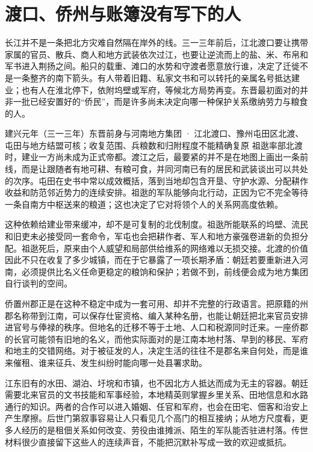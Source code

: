 \section{渡口、侨州与账簿没有写下的人}
\label{sec:eastern-jin-depth-migration-fiscal}

长江并不是一条把北方灾难自然隔在岸外的线。三一三年前后，江北渡口要让携带家属的官员、散兵、商人和地方武装依次过江，也要让逆流而上的盐、米、布帛和军书进入荆扬之间。船只的载重、滩口的水势和守渡者愿意放行谁，决定了迁徙不是一条整齐的南下箭头。有人带着旧籍、私家文书和可以转托的亲属名号抵达建业；也有人在淮北停下，依附坞壁或军府，等候北方局势再变。东晋最初面对的并非一批已经安置好的“侨民”，而是许多尚未决定向哪一种保护关系缴纳劳力与粮食的人。

\begin{event}{}{建兴元年（三一三年）}{东晋前身与河南地方集团 · 江北渡口、豫州屯田区}{北渡、屯田与地方结盟可核；收复范围、兵粮数和归附程度不能精确复原}
祖逖率部北渡时，建业一方尚未成为正式帝都。渡江之后，最要紧的并不是在地图上画出一条前线，而是让跟随者有地可耕、有粮可食，并同河南已有的居民和武装谈出可以共处的次序。屯田在史书中常以成效概括，落到当地却包含开垦、守护水源、分配耕作收益和防范邻近势力的连续安排。祖逖的军队能够向北行动，正因为它不完全等待一条自南方中枢送来的粮道；这也决定了它对将领个人的关系网高度依赖。

这种依赖给建业带来缓冲，却不是可复制的北伐制度。祖逖所能联系的坞壁、流民和旧吏未必接受同一套命令，军屯也会把耕作者、军人和地方豪强卷进新的负担分配。祖逖死后，原来由个人威望和局部供给维系的网络难以无损交接。北渡的价值因此不只在收复了多少城镇，而在于它暴露了一项长期矛盾：朝廷若要重新进入河南，必须提供比名义任命更稳定的粮饷和保护；若做不到，前线便会成为地方集团自行谈判的空间。
\end{event}

侨置州郡正是在这种不稳定中成为一套可用、却并不完整的行政语言。把原籍的州郡名称带到江南，可以保存仕宦资格、编入某种名册，也能让朝廷把北来官员安排进官号与俸禄的秩序。但地名的迁移不等于土地、人口和税源同时迁来。一座侨郡的长官可能领有旧地的名义，而他实际面对的是江南本地村落、早到的移民、军府和地主的交错网络。对于被征发的人，决定生活的往往不是郡名来自何处，而是谁来催租、谁来征兵、发生纠纷时能向哪一处县署求助。

江东旧有的水田、湖泊、圩垸和市镇，也不因北方人抵达而成为无主的容器。朝廷需要北来官员的文书技能和军事经验，本地精英则掌握乡里关系、田地信息和水路通行的知识。两者的合作可以进入婚姻、任官和军府，也会在田宅、佃客和治安上产生摩擦。后世门第叙事容易让人只看见几个高门的相互接纳；从地方尺度看，更多人经历的是租佃关系如何改变、劳役由谁摊派、陌生的军队能否驻进村落。传世材料很少直接留下这些人的连续声音，不能把沉默补写成一致的欢迎或抵抗。

